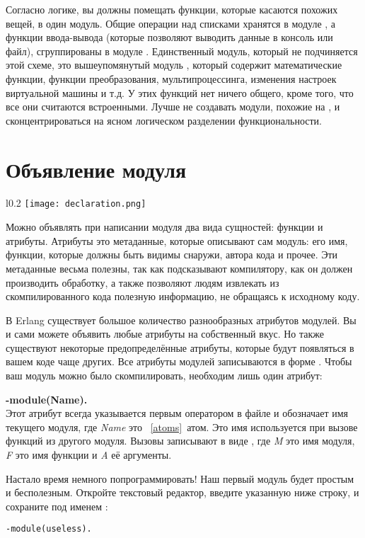 Согласно логике, вы должны помещать функции, которые касаются похожих вещей, в один модуль.
Общие операции над списками хранятся в модуле , а функции ввода\--вывода (которые позволяют выводить данные в консоль или файл), сгруппированы в модуле .
Единственный модуль, который не подчиняется этой схеме, это вышеупомянутый модуль , который содержит математические функции, функции преобразования, мультипроцессинга, изменения настроек виртуальной машины и т.д.
У этих функций нет ничего общего, кроме того, что все они считаются встроенными.
Лучше не создавать модули, похожие на , и сконцентрироваться на ясном логическом разделении функциональности.
\section{Объявление модуля}
\label{module-declaration}
\begin{wrapfigure}{l}{0.2\linewidth}
    \texttt{[image: declaration.png]}
\end{wrapfigure}
Можно объявлять при написании модуля два вида сущностей: функции и атрибуты.
Атрибуты это метаданные, которые описывают сам модуль: его имя, функции, которые должны быть видимы снаружи, автора кода и прочее.
Эти метаданные весьма полезны, так как подсказывают компилятору, как он должен производить обработку, а также позволяют людям извлекать из скомпилированного кода полезную информацию, не обращаясь к исходному коду.

В Erlang существует большое количество разнообразных атрибутов модулей.
Вы и сами можете объявить любые атрибуты на собственный вкус.
Но также существуют некоторые предопределённые атрибуты, которые будут появляться в вашем коде чаще других.
Все атрибуты модулей записываются в форме .
Чтобы ваш модуль можно было скомпилировать, необходим лишь один атрибут:

\begin{minipage}{1\linewidth}
    \textbf{-module(Name).}\\ 
    Этот атрибут всегда указывается первым оператором в файле и обозначает имя текущего модуля, где \emph{Name} это ~\ref{atoms}~атом.
    Это имя используется при вызове функций из другого модуля.
    Вызовы записывают в виде , где \emph{M} это имя модуля, \emph{F} это имя функции и \emph{A} её аргументы.
\end{minipage}

Настало время немного попрограммировать!
Наш первый модуль будет простым и бесполезным.
Откройте текстовый редактор, введите указанную ниже строку, и сохраните под именем :
\begin{lstlisting}[style=repl]
-module(useless).
\end{lstlisting}

